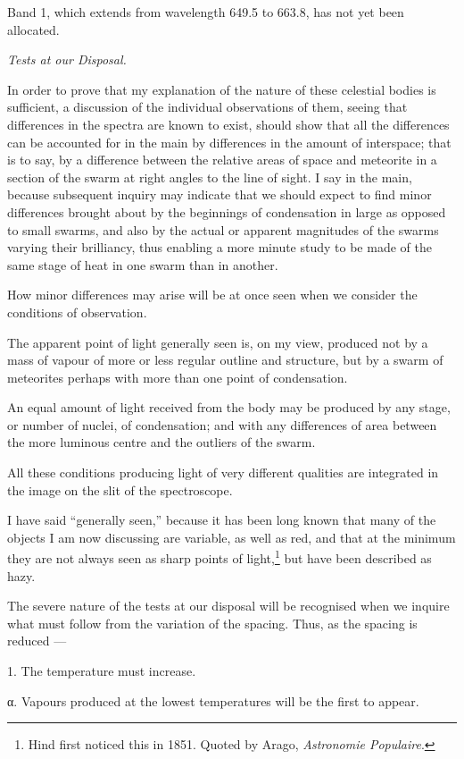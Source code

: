 \documentclass[a4paper, 12pt, oneside, polutonikogreek, english]{article}
\begin{document}
Band 1, which extends from wavelength 649.5 to 663.8, has not yet been allocated.

\emph{Tests at our Disposal.}

In order to prove that my explanation of the nature of these celestial bodies is sufficient, a discussion of the individual observations of them, seeing that differences in the spectra are known to exist, should show that all the differences can be accounted for in the main by differences in the amount of interspace; that is to say, by a difference between the relative areas of space and meteorite in a section of the swarm at right angles to the line of sight. I say in the main, because subsequent inquiry may indicate that we should expect to find minor differences brought about by the beginnings of condensation in large as opposed to small swarms, and also by the actual or apparent magnitudes of the swarms varying their brilliancy, thus enabling a more minute study to be made of the same stage of heat in one swarm than in another.

How minor differences may arise will be at once seen when we consider the conditions of observation.

The apparent point of light generally seen is, on my view, produced not by a mass of vapour of more or less regular outline and structure, but by a swarm of meteorites perhaps with more than one point of condensation.

An equal amount of light received from the body may be produced by any stage, or number of nuclei, of condensation; and with any differences of area between the more luminous centre and the outliers of the swarm.

All these conditions producing light of very different qualities are integrated in the image on the slit of the spectroscope.

I have said ``generally seen,'' because it has been long known that many of the objects I am now discussing are variable, as well as red, and that at the minimum they are not always seen as sharp points of light,\footnote{Hind first noticed this in 1851. Quoted by Arago, \emph{Astronomie Populaire}.} but have been described as hazy.

The severe nature of the tests at our disposal will be recognised when we inquire what must follow from the variation of the spacing. Thus, as the spacing is reduced ---

1. The temperature must increase.

α. Vapours produced at the lowest temperatures will be the first to appear.
\end{document}
